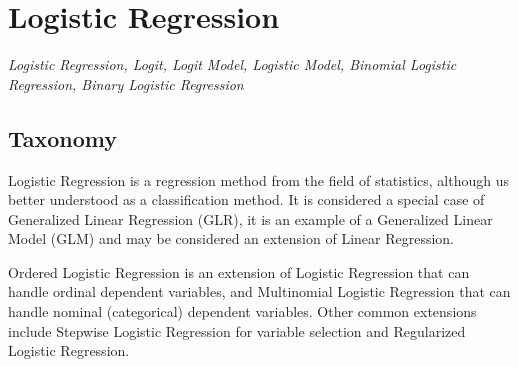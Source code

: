 
\section{Logistic Regression} 
\label{sec:logistic}

\emph{Logistic Regression, Logit, Logit Model, Logistic Model, Binomial Logistic Regression, Binary Logistic Regression}

\subsection{Taxonomy}
Logistic Regression is a regression method from the field of statistics, although us better understood as a classification method. It is considered a special case of Generalized Linear Regression (GLR), it is an example of a Generalized Linear Model (GLM) and may be considered an extension of Linear Regression.

Ordered Logistic Regression is an extension of Logistic Regression that can handle ordinal dependent variables, and Multinomial Logistic Regression that can handle nominal (categorical) dependent variables. Other common extensions include Stepwise Logistic Regression for variable selection and Regularized Logistic Regression.

